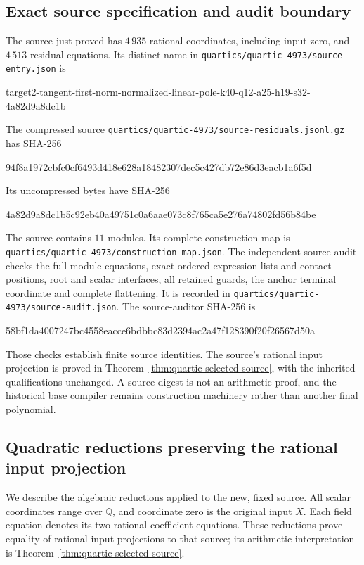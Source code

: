 \documentclass[11pt]{article}
\theoremstyle{definition}
\theoremstyle{remark}
\newcommand{\Q}{\mathbb Q}
\begin{document}
\subsection{Exact source specification and audit boundary}
The source just proved has $4\,935$ rational coordinates,
including input zero, and $4\,513$ residual equations.
Its distinct name in \nolinkurl{quartics/quartic-4973/source-entry.json} is
\begin{center}\footnotesize\ttfamily
target2-tangent-first-norm-normalized-linear-pole-k40-q12-a25-h19-s32-4a82d9a8dc1b
\end{center}
The compressed source \nolinkurl{quartics/quartic-4973/source-residuals.jsonl.gz} has SHA-256
\begin{center}\footnotesize\ttfamily
94f8a1972cbfc0cf6493d418e628a18482307dec5c427db72e86d3eacb1a6f5d
\end{center}
Its uncompressed bytes have SHA-256
\begin{center}\footnotesize\ttfamily
4a82d9a8dc1b5c92eb40a49751c0a6aae073c8f765ca5e276a74802fd56b84be
\end{center}
The source contains $11$ modules. Its complete construction map is \nolinkurl{quartics/quartic-4973/construction-map.json}.
The independent source audit checks the full module equations, exact
ordered expression lists and contact positions, root and scalar interfaces,
all retained guards, the anchor terminal coordinate and complete flattening.
It is recorded in \nolinkurl{quartics/quartic-4973/source-audit.json}. The source-auditor SHA-256 is
\begin{center}\footnotesize\ttfamily
58bf1da4007247bc4558eacce6bdbbc83d2394ac2a47f128390f20f26567d50a
\end{center}
Those checks establish finite source identities. The source's rational
input projection is proved in Theorem~\ref{thm:quartic-selected-source},
with the inherited qualifications unchanged. A source digest is not an
arithmetic proof, and the historical base compiler remains construction
machinery rather than another final polynomial.

\subsection{Quadratic reductions preserving the rational input projection}
\label{subsec:quartic-reductions}

We describe the algebraic reductions applied to the new, fixed source.
All scalar coordinates range over $\Q$, and coordinate zero is the original
input $X$. Each field equation denotes its two rational coefficient
equations. These reductions prove equality of rational input projections
to that source; its arithmetic interpretation is
Theorem~\ref{thm:quartic-selected-source}.
\end{document}
